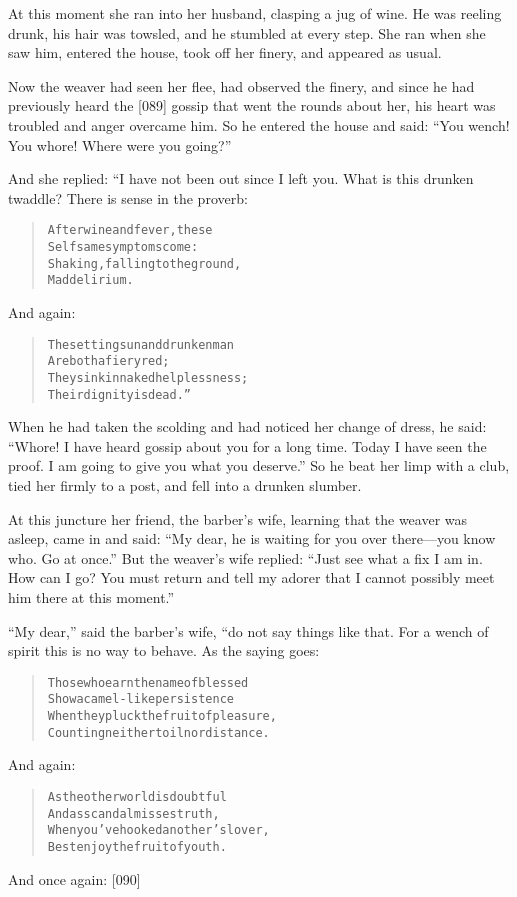 \documentclass[article, twoside, 14pt]{memoir}
\renewenvironment{verbatim}{%
\begin{quote}%
\vskip -10pt%
\begin{alltt}\normalfont\large}{\end{alltt}%
\end{quote}%
\vskip -10pt
} %
\begin{document}
At this moment she ran into her husband, clasping a jug of wine. He
was reeling drunk, his hair was towsled, and he stumbled at every
step. She ran when she saw him, entered the house, took off her
finery, and appeared as usual.

Now the weaver had seen her flee, had observed the finery, and
since he had previously heard the [089] gossip that went the rounds
about her, his heart was troubled and anger overcame him. So he
entered the house and said:
``You wench! You whore! Where were you going?''

And she replied: “I have not been out since I left you. What is
this drunken twaddle? There is sense in the proverb:

\begin{verbatim}
After wine and fever, these
    Selfsame symptoms come:
Shaking, falling to the ground,
    Mad delirium.
\end{verbatim}
And again:

\begin{verbatim}
The setting sun and drunken man
    Are both a fiery red;
They sink in naked helplessness;
    Their dignity is dead.”
\end{verbatim}
When he had taken the scolding and had noticed her change of dress,
he said:
``Whore! I have heard gossip about you for a long time. Today I have seen the proof. I am going to give you what you deserve.''
So he beat her limp with a club, tied her firmly to a post, and
fell into a drunken slumber.

At this juncture her friend, the barber's wife, learning that the
weaver was asleep, came in and said:
``My dear, he is waiting for you over there---you know who. Go at once.''
But the weaver's wife replied:
``Just see what a fix I am in. How can I go? You must return and tell my adorer that I cannot possibly meet him there at this moment.''

``My dear,'' said the barber's wife, “do not say things like that.
For a wench of spirit this is no way to behave. As the saying
goes:

\begin{verbatim}
Those who earn the name of blessed
    Show a camel-like persistence
When they pluck the fruit of pleasure,
    Counting neither toil nor distance.
\end{verbatim}
And again:

\begin{verbatim}
As the other world is doubtful
    And as scandal misses truth,
When you've hooked another's lover,
    Best enjoy the fruit of youth.
\end{verbatim}
And once again: [090]
\end{document}
